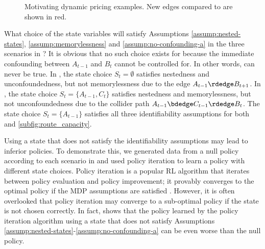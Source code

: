 \documentclass[12pt,a4paper]{article}
\theoremstyle{definition}
\begin{document}
\begin{figure}[t]

  \caption{Motivating dynamic pricing examples. New edges compared to
     are shown in red.}
  \label{fig:simple_dynamic_pricing}
\end{figure}

What choice of the state variables will satisfy Assumptions
\ref{assump:nested-states}, \ref{assump:memorylessness} and
\ref{assump:no-confounding-a} in the three scenarios in
? It is obvious that no such choice
exists for  because the immediate
confounding between $A_{t-1}$ and $B_t$ cannot be controlled for. In
other words,  can never be true. In
, the state choice $S_t = \emptyset$ satisfies
nestedness and unconfoundedness, but not memorylessness due to the edge
$A_{t-1} \rdedge B_{t+1}$. %
In
, the state choice $S_t = \{A_{t-1},
C_t\}$ satisfies nestedness and memorylessness, but not
unconfoundedness due to the collider path $A_{t-1} \bdedge C_{t-1}
\rdedge B_t$. The state choice $S_t = \{A_{t-1}\}$ satisfies all
three identifiability assumptions for both  and \ref{subfig:route_capacity}.

Using a state that does not satisfy the identifiability assumptions
may lead to inferior policies. To demonstrate this, we generated data
from a null policy according to each scenario in
 and used policy iteration to learn a
policy with different state choices. Policy iteration is a popular
RL algorithm that iterates between policy evaluation and
policy improvement; it provably converges to the optimal policy if
the MDP assumptions are satisfied
\parencite{howard:dp,sutton_reinforcement_2018}. However, it is often
overlooked that policy iteration may converge to a sub-optimal
policy if the state is not chosen correctly. In fact,
 shows that the policy learned by the
policy iteration algorithm using a state that does not satisfy
Assumptions \ref{assump:nested-states}-\ref{assump:no-confounding-a}
can be even worse than the null policy.
\end{document}
